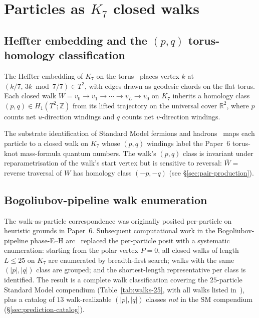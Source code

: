 \documentclass[11pt]{article}
\begin{document}
\section{Particles as $K_7$ closed walks}
\label{sec:walks-as-particles}

\subsection{Heffter embedding and the $(p, q)$ torus-homology classification}
\label{sec:heffter-pq}

The Heffter embedding of $K_7$ on the torus~\cite{Heffter} places vertex $k$ at $(k/7,\, 3k \bmod 7 / 7) \in T^2$, with edges drawn as geodesic chords on the flat torus.  Each closed walk $W = v_0 \to v_1 \to \cdots \to v_L \to v_0$ on $K_7$ inherits a homology class $(p, q) \in H_1(T^2; \mathbb{Z})$ from its lifted trajectory on the universal cover $\mathbb{R}^2$, where $p$ counts net $u$-direction windings and $q$ counts net $v$-direction windings.

The substrate identification of Standard Model fermions and hadrons~\cite{Paper6} maps each particle to a closed walk on $K_7$ whose $(p, q)$ windings label the Paper~6 torus-knot mass-formula quantum numbers.  The walk's $(p, q)$ class is invariant under reparametrisation of the walk's start vertex but is sensitive to reversal: $\bar W = $ reverse traversal of $W$ has homology class $(-p, -q)$ (see \S\ref{sec:pair-production}).

\subsection{Bogoliubov-pipeline walk enumeration}
\label{sec:bogoliubov-enumeration}

The walk-as-particle correspondence was originally posited per-particle on heuristic grounds in Paper~6.  Subsequent computational work in the Bogoliubov-pipeline phase-E--H arc~\cite{BogoliubovPipeline} replaced the per-particle posit with a systematic enumeration: starting from the polar vertex $P = 0$, all closed walks of length $L \leq 25$ on $K_7$ are enumerated by breadth-first search; walks with the same $(|p|, |q|)$ class are grouped; and the shortest-length representative per class is identified.  The result is a complete walk classification covering the $25$-particle Standard Model compendium (Table~\ref{tab:walks-25}, with all walks listed in~\cite{BogoliubovPipeline}), plus a catalog of $13$ walk-realizable $(|p|, |q|)$ classes \emph{not} in the SM compendium (\S\ref{sec:prediction-catalog}).
\end{document}
